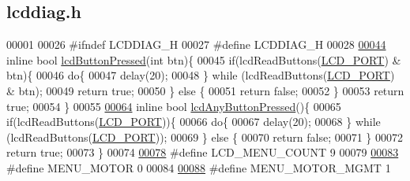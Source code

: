 \hypertarget{lcddiag_8h_source}{}\subsection{lcddiag.\+h}
\label{lcddiag_8h_source}

\begin{DoxyCode}
00001 
00026 \textcolor{preprocessor}{#ifndef LCDDIAG\_H}
00027 \textcolor{preprocessor}{#define LCDDIAG\_H}
00028 
\hypertarget{lcddiag_8h_source.tex_l00044}{}\hyperlink{lcddiag_8h_a74e4c744db49f9b7b645095575e152ad}{00044} \textcolor{keyword}{inline} \textcolor{keywordtype}{bool} \hyperlink{lcddiag_8h_a74e4c744db49f9b7b645095575e152ad}{lcdButtonPressed}(\textcolor{keywordtype}{int} btn)\{
00045     \textcolor{keywordflow}{if}(lcdReadButtons(\hyperlink{lcdmsg_8h_abcf42bd88b3c36193f301ca25b033875}{LCD\_PORT}) & btn)\{
00046         \textcolor{keywordflow}{do}\{
00047             delay(20);
00048         \} \textcolor{keywordflow}{while} (lcdReadButtons(\hyperlink{lcdmsg_8h_abcf42bd88b3c36193f301ca25b033875}{LCD\_PORT}) & btn);
00049         \textcolor{keywordflow}{return} \textcolor{keyword}{true};
00050     \} \textcolor{keywordflow}{else} \{
00051         \textcolor{keywordflow}{return} \textcolor{keyword}{false};
00052     \}
00053     \textcolor{keywordflow}{return} \textcolor{keyword}{true};
00054 \}
00055 
\hypertarget{lcddiag_8h_source.tex_l00064}{}\hyperlink{lcddiag_8h_a0592813f995bfeeadb9bee923833ed35}{00064} \textcolor{keyword}{inline} \textcolor{keywordtype}{bool} \hyperlink{lcddiag_8h_a0592813f995bfeeadb9bee923833ed35}{lcdAnyButtonPressed}()\{
00065     \textcolor{keywordflow}{if}(lcdReadButtons(\hyperlink{lcdmsg_8h_abcf42bd88b3c36193f301ca25b033875}{LCD\_PORT}))\{
00066         \textcolor{keywordflow}{do}\{
00067             delay(20);
00068         \} \textcolor{keywordflow}{while} (lcdReadButtons(\hyperlink{lcdmsg_8h_abcf42bd88b3c36193f301ca25b033875}{LCD\_PORT}));
00069     \} \textcolor{keywordflow}{else} \{
00070         \textcolor{keywordflow}{return} \textcolor{keyword}{false};
00071     \}
00072     \textcolor{keywordflow}{return} \textcolor{keyword}{true};
00073 \}
00074 
\hypertarget{lcddiag_8h_source.tex_l00078}{}\hyperlink{lcddiag_8h_af08e03edfc50fa6a3af2555f9cce6e6c}{00078} \textcolor{preprocessor}{#define LCD\_MENU\_COUNT 9}
00079 
\hypertarget{lcddiag_8h_source.tex_l00083}{}\hyperlink{lcddiag_8h_ae6fe324cd9273893eee9eb0d5769e4f0}{00083} \textcolor{preprocessor}{#define MENU\_MOTOR 0}
00084 
\hypertarget{lcddiag_8h_source.tex_l00088}{}\hyperlink{lcddiag_8h_a167e3569f77429ebc3565f22e6efeed5}{00088} \textcolor{preprocessor}{#define MENU\_MOTOR\_MGMT 1}

\end{DoxyCode}
